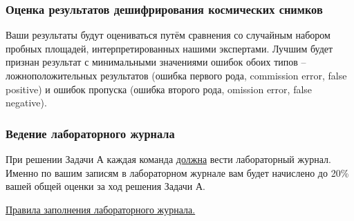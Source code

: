 \subsubsection*{Оценка результатов дешифрирования космических снимков}

Ваши результаты будут оцениваться путём сравнения со случайным набором пробных площадей, интерпретированных нашими экспертами. Лучшим будет признан результат с минимальными значениями ошибок обоих типов – ложноположительных результатов (ошибка первого рода, commission error, false positive) и ошибок пропуска (ошибка второго рода, omission error, false negative).

\subsubsection*{Ведение лабораторного журнала}

При решении Задачи А каждая команда \underline{должна} вести лабораторный журнал. Именно по вашим записям в лабораторном журнале вам будет начислено до 20\% вашей общей оценки за ход решения Задачи А.

\underline{Правила заполнения лабораторного журнала.}

